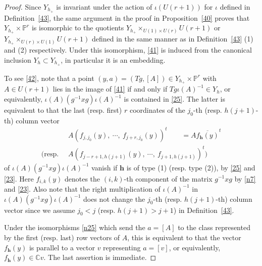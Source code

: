 \documentclass[11pt]{article}
\theoremstyle{definition}
\numberwithin{equation}{section}
\numberwithin{equation}{section}
\newcommand{\C}{\mathbb{C}}
\newcommand{\PP}{\mathbb{P}}
\newcommand\bh{\mathbf{h}}
\begin{document}
\begin{proof}
	Since $Y_{h_+}$ is invariant under the action of $\iota(U(r+1))$ for $\iota$ defined in Definition~\ref{43}, 
	the same argument in the proof in Proposition~\ref{40} proves that $Y_{h_+}\times \PP^r$ is isomorphic to the quotients $Y_{h_+}\times_{U(1)\times U(r)}U(r+1)$ or $Y_{h_+}\times_{U(r)\times U(1)}U(r+1)$ defined in the same manner as in Definition~\ref{43} (1) and (2) respectively.
 	Under this isomorphism, \eqref{41} is induced from the canonical inclusion $Y_h\subset Y_{h_+}$, in particular it is an embedding. 
 	
 	To see \eqref{42}, note that a point $(y,a)=(Tg,[A])\in Y_{h_+}\times \PP^r$ with $A\in U(r+1)$ lies in the image of \eqref{41} if and only if $Tg\iota(A)^{-1}\in Y_h$, or equivalently, $\iota(A)(g^{-1}x g)\iota(A)^{-1}$ is contained in \eqref{25}. 
  	The latter is equivalent to that the last (resp. first) $r$ coordinates of the 
  	$j_0$-th (resp. $h(j+1)$-th)
  	column vector
 	\begin{equation}\label{52}
 		\begin{split}
 			&A (f_{j,j_0}(y),~\cdots,~f_{j+r,j_0}(y))^t\qquad =A \overline{f_\bh(y)}^t\\
 			(\text{resp. } ~&A (f_{j-r+1,h(j+1)}(y),~\cdots,~ f_{j+1,h(j+1)} )^t)
 		\end{split}
 	\end{equation}
 	of $\iota(A)(g^{-1}x g)\iota(A)^{-1}$ vanish if $\bh$ is of type (1) (resp. type (2)), by \eqref{25} and \eqref{23}. 
 	Here $f_{i,k}(y)$ denotes the $(i,k)$-th component of the matrix $g^{-1}xg$ by \eqref{n7} and \eqref{23}. Also note that the right multiplication of $\iota(A)^{-1}$ in $\iota(A)(g^{-1}x g)\iota(A)^{-1}$ does not change the $j_0$-th (resp. $h(j+1)$-th) column vector since we assume $j_0<j$ (resp. $h(j+1)>j+1$) in Definition~\ref{43}.

 	
 	Under the isomorphisms \eqref{n25} which send the $a=[A]$ to the class represented by the first (resp. last) row vectors of $A$, this is equivalent to that the vector $f_\bh(y)$ is parallel to a vector $v$ representing $a=[v]$, or equivalently, $f_\bh(y)\in \C v$. 
 	The last assertion is immediate.
\end{proof}
\end{document}
